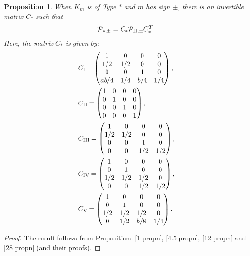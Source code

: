 \documentclass[table]{amsart}
\newtheorem{proposition}[theorem]{Proposition}
\numberwithin{equation}{section}
\begin{document}
\begin{proposition}\label{main prop section 3}
    When $K_m$ is of Type $\ast$ and $m$ has sign $\pm$, there is an invertible matrix $C_\ast$ such that 
    \[\mathcal{P}_{\ast, \pm}=C_\ast\mathcal{P}_{\rm{II}, \pm}C_\ast^T.\] Here, the matrix $C_\ast$ is given by:
    \[\begin{split}
        & C_{\rm{I}}=  \begin{pmatrix}
1 & 0 & 0 & 0 \\
1/2 & 1/2 & 0 & 0 \\
0 & 0 & 1 & 0 \\
ab/4 & 1/4 & b/4 & 1/4
\end{pmatrix},\\
& C_{\rm{II}}=  \begin{pmatrix}
1 & 0 & 0 & 0 \\
0 & 1 & 0 & 0 \\
0 & 0 & 1 & 0 \\
0 & 0 & 0 & 1
\end{pmatrix},\\
& C_{\rm{III}}=\begin{pmatrix}
1 & 0 & 0 & 0 \\
1/2 & 1/2 & 0 & 0 \\
0 & 0 & 1 & 0 \\
0 & 0 & 1/2 & 1/2
\end{pmatrix}, \\
& C_{\rm{IV}}=\begin{pmatrix}
1 & 0 & 0 & 0 \\
0 & 1 & 0 & 0 \\
1/2 & 1/2 & 1/2 & 0 \\
0 & 0 & 1/2 & 1/2
\end{pmatrix},\\
& C_{\rm{V}}= \begin{pmatrix}
1 & 0 & 0 & 0 \\
0 & 1 & 0 & 0 \\
1/2 & 1/2 & 1/2 & 0 \\
0 & 1/2 & b/8 & 1/4
\end{pmatrix}.
    \end{split}\]
\end{proposition}

\begin{proof}
    The result follows from Propositions \ref{1 propn}, \ref{4.5 propn}, \ref{12 propn} and \ref{28 propn} (and their proofs).
\end{proof}
\end{document}
